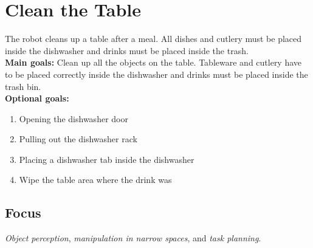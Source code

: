 \section{Clean the Table}
\label{test:clean-the-table}
The robot cleans up a table after a meal. All dishes and cutlery must be placed inside the dishwasher and drinks must be placed inside the trash. \\

\noindent \textbf{Main goals:}  Clean up all the objects on the table. Tableware and cutlery have to be placed correctly inside the dishwasher and drinks must be placed inside the trash bin. \\

\noindent \textbf{Optional goals:}
\begin{enumerate}[nosep]
	\item Opening the dishwasher door
	\item Pulling out the dishwasher rack
	\item Placing a dishwasher tab inside the dishwasher
	\item Wipe the table area where the drink was
\end{enumerate}

\subsection*{Focus}
\emph{Object perception}, \emph{manipulation in narrow spaces}, and \emph{task planning}.

